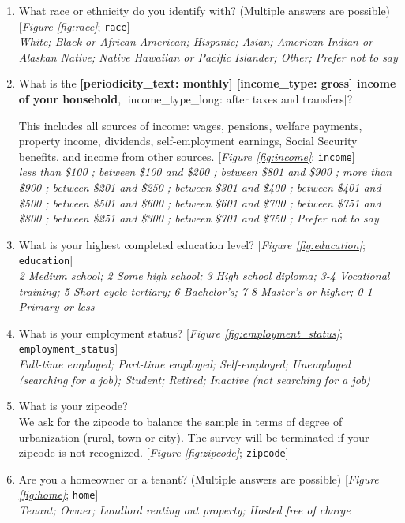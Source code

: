 \begin{enumerate}[resume]
\item  \label{q:race} What race or ethnicity do you identify with? (Multiple answers are possible) [\textit{Figure \ref{fig:race}}; 
\verb|race|]
  \\ \textit{White; Black or African American; Hispanic; Asian; American Indian or Alaskan Native; Native Hawaiian or Pacific Islander; Other; Prefer not to say}

\item  \label{q:income} What is the \textbf{[periodicity\_text: monthly] [income\_type: gross] income of your household}, [income\_type\_long: after taxes and transfers]?

This includes all sources of income: wages, pensions, welfare payments, property income, dividends, self-employment earnings, Social Security benefits, and income from other sources. [\textit{Figure \ref{fig:income}}; 
\verb|income|]
  \\ \textit{less than \$100 ; between \$100 and \$200 ; between \$801 and \$900 ; more than \$900 ; between \$201 and \$250 ; between \$301 and \$400 ; between \$401 and \$500 ; between \$501 and \$600 ; between \$601 and \$700 ; between \$751 and \$800 ; between \$251 and \$300 ; between \$701 and \$750 ; Prefer not to say}

\item  \label{q:education} What is your highest completed education level? [\textit{Figure \ref{fig:education}}; 
\verb|education|]
  \\ \textit{2 Medium school; 2 Some high school; 3 High school diploma; 3-4 Vocational training; 5 Short-cycle tertiary; 6 Bachelor's; 7-8 Master's or higher; 0-1 Primary or less}

\item  \label{q:employment_status} What is your employment status? [\textit{Figure \ref{fig:employment_status}}; 
\verb|employment_status|]
  \\ \textit{Full-time employed; Part-time employed; Self-employed; Unemployed (searching for a job); Student; Retired; Inactive (not searching for a job)}

\item  \label{q:zipcode} What is your zipcode?\\
We ask for the zipcode to balance the sample in terms of degree of urbanization (rural, town or city). The survey will be terminated if your zipcode is not recognized. [\textit{Figure \ref{fig:zipcode}}; 
\verb|zipcode|]


\item  \label{q:home} Are you a homeowner or a tenant? (Multiple answers are possible) [\textit{Figure \ref{fig:home}}; 
\verb|home|]
  \\ \textit{Tenant; Owner; Landlord renting out property; Hosted free of charge}


\end{enumerate}
